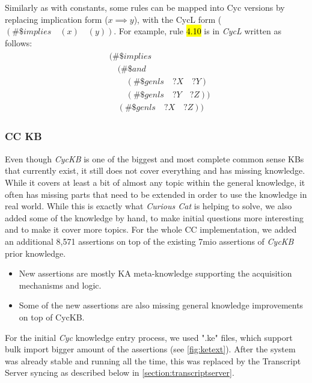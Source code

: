 Similarly as with constants, some rules can be mapped into Cyc versions by 
replacing implication form ($x \implies y$), with the CycL form 
($(\#\$implies\quad (x) \quad (y))$. For example, rule \hl{4.10} is in
 \emph{CycL} written as follows:
\begin{equation}\label{as:cycrule}
\begin{gathered}
\begin{aligned}
&(\#\$implies\\
	&\quad(\#\$and\\
		&\qquad(\#\$genls\quad?X\quad?Y)\\
		&\qquad(\#\$genls\quad?Y\quad?Z))\\
	&\quad(\#\$genls\quad?X\quad?Z))
\end{aligned}
\end{gathered}
\end{equation}

\subsubsection{CC KB}
\label{section:cckb}
Even though \emph{CycKB} is one of the biggest and most complete common sense 
KBs that currently exist, it still does not cover everything and has missing 
knowledge. While it covers at least a bit of almost any topic within the general
knowledge, it often has missing parts that need to be extended in order to use
the knowledge in real world. While this is exactly what \emph{Curious Cat} is
helping to solve, we also added some of the knowledge by hand, to make initial
questions more interesting and to make it cover more topics. For the whole CC
implementation, we added an additional 8,571 assertions on top of the existing 
7mio assertions of \emph{CycKB} prior knowledge.
\begin{itemize}
\item New assertions are mostly KA meta-knowledge supporting the acquisition
mechanisms and logic.
\item Some of the new assertions are also missing general knowledge 
improvements on top of CycKB.
\end{itemize}

For the initial \emph{Cyc} knowledge entry process, we used ".ke" files, 
which support bulk import bigger amount of the assertions (see 
\autoref{fig:ketext}). After the system was already stable and running all the
time, this was replaced by the Transcript Server syncing as described below
in \autoref{section:transcriptserver}.

